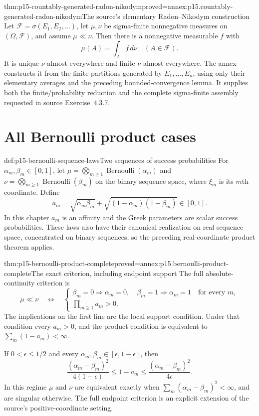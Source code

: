 \begin{hbtheorem}{thm:p15-countably-generated-radon-nikodym}{proved=annex:p15.countably-generated-radon-nikodym}{The source's elementary Radon--Nikodym construction}
Let \(\mathcal F=\sigma(E_1,E_2,\ldots)\), let \(\mu,\nu\) be
sigma-finite nonnegative measures on \((\Omega,\mathcal F)\), and
assume \(\mu\ll\nu\). Then there is a nonnegative measurable \(f\)
with
\[
                            \mu(A)=\int_A f\,d\nu
                                   \quad(A\in\mathcal F).
\]
It is unique \(\nu\)-almost everywhere and finite
\(\nu\)-almost everywhere. The annex constructs it from the finite
partitions generated by \(E_1,\ldots,E_n\), using only their
elementary averages and the preceding bounded-convergence lemma.
It supplies both the finite/probability reduction and the complete
sigma-finite assembly requested in source Exercise~4.3.7.
\end{hbtheorem}

\section{All Bernoulli product cases}

\begin{hbdefinition}{def:p15-bernoulli-sequence-laws}{Two sequences of success probabilities}
For \(\alpha_m,\beta_m\in[0,1]\), let
\(\mu=\bigotimes_{m\geq1}\operatorname{Bernoulli}(\alpha_m)\) and
\(\nu=\bigotimes_{m\geq1}\operatorname{Bernoulli}(\beta_m)\)
on the binary sequence space, where \(\xi_m\) is its \(m\)th coordinate.
Define
\[
 a_m=\sqrt{\alpha_m\beta_m}
                 +\sqrt{(1-\alpha_m)(1-\beta_m)}\in[0,1].
\]
In this chapter \(a_m\) is an affinity and the Greek parameters
are scalar success probabilities. These laws also have their
canonical realization on real sequence space, concentrated on binary
sequences, so the preceding real-coordinate product theorem applies.
\end{hbdefinition}

\begin{hbtheorem}{thm:p15-bernoulli-product-complete}{proved=annex:p15.bernoulli-product-complete}{The exact criterion, including endpoint support}
The full absolute-continuity criterion is
\[
 \mu\ll\nu
 \quad\Longleftrightarrow\quad
 \left\{
 \begin{array}{l}
  \beta_m=0\Longrightarrow\alpha_m=0,\quad
  \beta_m=1\Longrightarrow\alpha_m=1
                   \quad\text{for every }m,\\
  \prod_{m\geq1}a_m>0 .
 \end{array}\right.
\]
The implications on the first line are the local support condition.
Under that condition every \(a_m>0\), and the product condition
is equivalent to \(\sum_m(1-a_m)<\infty\).

If \(0<\epsilon\leq1/2\) and every
\(\alpha_m,\beta_m\in[\epsilon,1-\epsilon]\), then
\[
 \frac{(\alpha_m-\beta_m)^2}{4(1-\epsilon)}
       \leq1-a_m
       \leq\frac{(\alpha_m-\beta_m)^2}{4\epsilon}.
\]
In this regime \(\mu\) and \(\nu\) are equivalent exactly when
\(\sum_m(\alpha_m-\beta_m)^2<\infty\), and are singular otherwise.
The full endpoint criterion is an explicit extension of the source's
positive-coordinate setting.
\end{hbtheorem}

